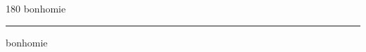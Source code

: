 
\begin{frame}
\begin{center}
\begin{turn}{180}
{\fontsize{2.5cm}{1em}\selectfont bonhomie}
\end{turn}
\vspace{1em}\par  
\hrule
\vspace{1em}\par  
{\fontsize{2.5cm}{1em}\selectfont bonhomie}
\end{center}
\end{frame}
